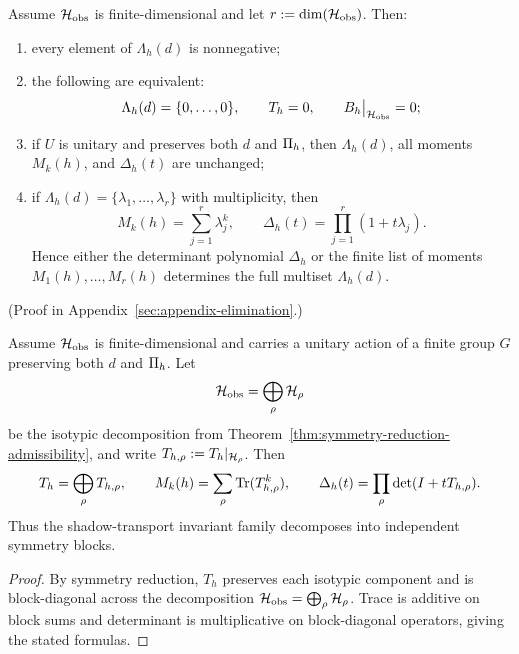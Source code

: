 \begin{theorem}
\label{thm:shadow-transport-package}
Assume $\cH_{\mathrm{obs}}$ is finite-dimensional and let
$r:=\dim(\cH_{\mathrm{obs}})$. Then:
\begin{enumerate}[label=(\roman*), itemsep=0.2em]
\item every element of $\Lambda_h(d)$ is nonnegative;
\item the following are equivalent:
      \[
      \Lambda_h(d)=\{0,\dots,0\},
      \qquad
      T_h=0,
      \qquad
      \CCLeak{d}{h}\big|_{\cH_{\mathrm{obs}}}=0;
      \]
\item if $U$ is unitary and preserves both $d$ and $\CCPi{h}$, then
      $\Lambda_h(d)$, all moments $M_k(h)$, and $\Delta_h(t)$ are unchanged;
\item if $\Lambda_h(d)=\{\lambda_1,\dots,\lambda_r\}$ with multiplicity, then
      \[
      M_k(h)=\sum_{j=1}^r \lambda_j^k,
      \qquad
      \Delta_h(t)=\prod_{j=1}^r (1+t\lambda_j).
      \]
      Hence either the determinant polynomial $\Delta_h$ or the finite list of
      moments $M_1(h),\dots,M_r(h)$ determines the full multiset
      $\Lambda_h(d)$.
\end{enumerate}
\end{theorem}

(Proof in Appendix~\ref{sec:appendix-elimination}.)

\begin{corollary}
\label{cor:shadow-transport-factorization}
Assume $\cH_{\mathrm{obs}}$ is finite-dimensional and carries a unitary action
of a finite group $G$ preserving both $d$ and $\CCPi{h}$. Let
\[
\cH_{\mathrm{obs}}=\bigoplus_\rho \cH_\rho
\]
be the isotypic decomposition from
Theorem~\ref{thm:symmetry-reduction-admissibility}, and write
$T_{h,\rho}:=T_h|_{\cH_\rho}$. Then
\[
T_h=\bigoplus_\rho T_{h,\rho},
\qquad
M_k(h)=\sum_\rho \Tr(T_{h,\rho}^k),
\qquad
\Delta_h(t)=\prod_\rho \det(I+tT_{h,\rho}).
\]
Thus the shadow-transport invariant family decomposes into independent symmetry
blocks.
\end{corollary}

\begin{proof}
By symmetry reduction, $T_h$ preserves each isotypic component and is
block-diagonal across the decomposition $\cH_{\mathrm{obs}}=\bigoplus_\rho
\cH_\rho$. Trace is additive on block sums and determinant is multiplicative on
block-diagonal operators, giving the stated formulas.
\end{proof}

